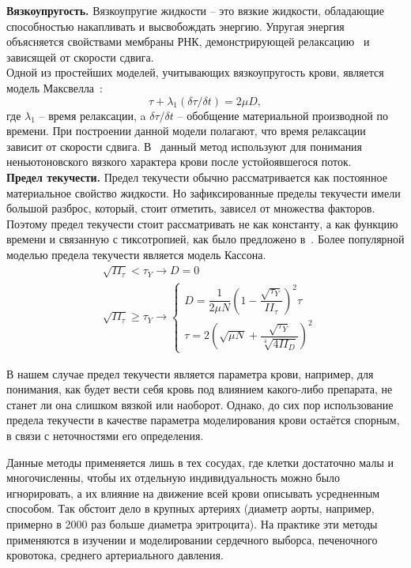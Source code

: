 \textbf{Вязкоупругость.}
Вязкоупругие жидкости -- это вязкие жидкости, обладающие способностью накапливать и высвобождать энергию. 
Упругая энергия объясняется свойствами мембраны РНК, демонстрирующей релаксацию~\cite{evans:1976} и зависящей от скорости сдвига.\\
Одной из простейших моделей, учитывающих вязкоупругость крови, является модель Максвелла~\cite{thurston:1972}:
$$
\tau+\lambda_1(\delta\tau / \delta t)=2\mu D,
$$  
где $\lambda_1$ -- время релаксации, a $\delta\tau / \delta t$ -- обобщение материальной производной по времени.
При построении данной модели полагают, что время релаксации зависит от скорости сдвига.
В~\cite{thurston:1994} данный метод используют для понимания неньютоновского вязкого характера крови после устойоявшегося поток.\\

\textbf{Предел текучести.}
Предел текучести обычно рассматривается как постоянное материальное свойство жидкости. 
Но зафиксированные пределы текучести имели большой разброс, который, стоит отметить, зависел от множества факторов.
Поэтому предел текучести стоит рассматривать не как константу, а как функцию времени и связанную с тиксотропией, 
как было предложено в~\cite{moller:2006}.
Более популярной моделью предела текучести является модель Кассона.
$$
\begin{aligned}
	&\sqrt{II_\tau} < \tau_Y\longrightarrow D=0 \\
	&\sqrt{II_\tau} \geq \tau_Y\longrightarrow
	\begin{cases}
		D   = \dfrac{1}{2\mu N}\left(1-\dfrac{\sqrt{\tau_Y}}{II_\tau}\right)^2\tau \\[10pt]
		\tau= 2\left(\sqrt{\mu N}+\dfrac{\sqrt{\tau_Y}}{\sqrt[4]{4II_D}}\right)^2
	\end{cases}
\end{aligned}
$$

В нашем случае предел текучести является параметра крови, например, для понимания, как будет вести себя кровь под влиянием какого-либо 
препарата, не станет ли она слишком вязкой или наоборот.
Однако, до сих пор использование предела текучести в качестве параметра моделирования крови остаётся спорным, 
в связи с неточностями его определения.

Данные методы применяется лишь в тех сосудах, где клетки достаточно малы и многочисленны, чтобы их отдельную индивидуальность можно было
игнорировать, а их влияние на движение всей крови описывать усредненным способом. 
Так обстоит дело в крупных артериях (диаметр аорты, например, примерно в 2000 раз больше диаметра эритроцита). 
На практике эти методы применяются в изучении и моделировании сердечного выборса, печеночного кровотока, среднего артериального давления.


